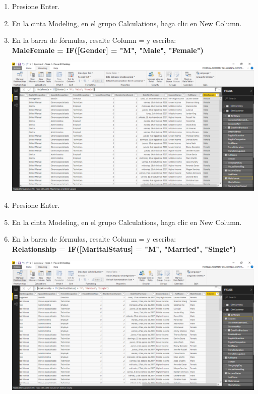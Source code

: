 \begin{enumerate}[1.]
    \item Presione Enter.
    \item En la cinta Modeling, en el grupo Calculations, haga clic en New Column.
    \item En la barra de fórmulas, resalte Column = y escriba: \\

\textbf{MaleFemale = IF([Gender] = "M", "Male", "Female")}\\

	\begin{center}
	\includegraphics[width=17cm]{./Imagenes/Ejercicio2-Tarea1/4}
	\end{center}	

    \item Presione Enter.
    \item En la cinta Modeling, en el grupo Calculations, haga clic en New Column.
    \item En la barra de fórmulas, resalte Column = y escriba:\\

\textbf{Relationship = IF([MaritalStatus] = "M", "Married", "Single")}\\

	\begin{center}
	\includegraphics[width=17cm]{./Imagenes/Ejercicio2-Tarea1/5}
	\end{center}	


\end{enumerate}
